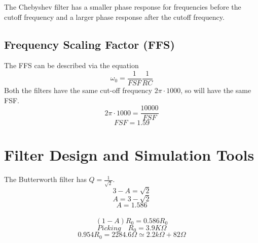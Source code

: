 \documentclass[12pt]{article}
\begin{document}
		The Chebyshev filter has a smaller phase response for frequencies before the cutoff frequency and a larger phase response after the cutoff frequency.
		
		\subsection{Frequency Scaling Factor (FFS)}
		The FFS can be described via the equation
		$$\omega_{0} = \frac{1}{FSF}\frac{1}{RC}$$
		Both the filters have the same cut-off frequency $2\pi\cdot1000$, so will have the same FSF.
		$$2\pi\cdot1000 = \frac{10000}{FSF}$$
		$$FSF = 1.59$$
		
		\section{Filter Design and Simulation Tools}
		The Butterworth filter has $Q = \frac{1}{\sqrt{2}}$.
		$$ 3-A = \sqrt{2}$$
		$$ A = 3 - \sqrt{2}$$
		$$ A = 1.586 $$\\
		$$ (1-A)R_{0} = 0.586R_{0}$$
		$$Picking\quad R_{0} = 3.9K\Omega$$
		$$0.954R_{0} = 2284.6\Omega \simeq 2.2k\Omega+82\Omega$$\\
		
\end{document}
